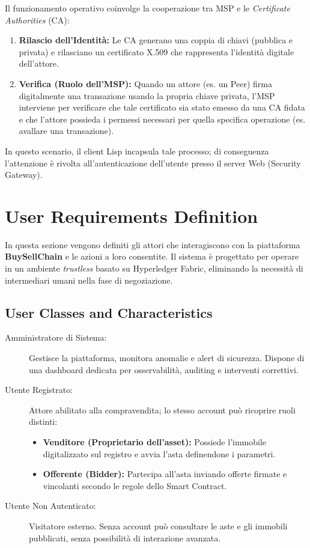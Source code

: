 \noindent Il funzionamento operativo coinvolge la cooperazione tra MSP e le \textit{Certificate Authorities} (CA):
\begin{enumerate}
    \item \textbf{Rilascio dell'Identità:} Le CA generano una coppia di chiavi (pubblica e privata) e rilasciano un certificato X.509 che rappresenta l'identità digitale dell'attore.
    \item \textbf{Verifica (Ruolo dell'MSP):} Quando un attore (es. un Peer) firma digitalmente una transazione usando la propria chiave privata, l'MSP interviene per verificare che tale certificato sia stato emesso da una CA fidata e che l'attore possieda i permessi necessari per quella specifica operazione (es. avallare una transazione).
\end{enumerate}
In questo scenario, il client Lisp incapsula tale processo; di conseguenza l'attenzione è rivolta all'autenticazione dell'utente presso il server Web (Security Gateway).

\section{User Requirements Definition}
In questa sezione vengono definiti gli attori che interagiscono con la piattaforma \textbf{BuySellChain} e le azioni a loro consentite. Il sistema è progettato per operare in un ambiente \emph{trustless} basato su Hyperledger Fabric, eliminando la necessità di intermediari umani nella fase di negoziazione.

\subsection*{User Classes and Characteristics}
\begin{description}
    \item[Amministratore di Sistema:]
    Gestisce la piattaforma, monitora anomalie e alert di sicurezza. Dispone di una dashboard dedicata per osservabilità, auditing e interventi correttivi.
    
    \item[Utente Registrato:]
    Attore abilitato alla compravendita; lo stesso account può ricoprire ruoli distinti:
    \begin{itemize}
        \item \textbf{Venditore (Proprietario dell'asset):} Possiede l'immobile digitalizzato sul registro e avvia l'asta definendone i parametri.
        \item \textbf{Offerente (Bidder):} Partecipa all'asta inviando offerte firmate e vincolanti secondo le regole dello Smart Contract.
    \end{itemize}
    
    \item[Utente Non Autenticato:]
    Visitatore esterno. Senza account può consultare le aste e gli immobili pubblicati, senza possibilità di interazione avanzata.
\end{description}

